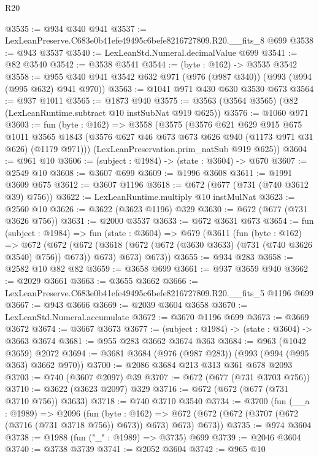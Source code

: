 \begin{lexlean}{R20}
\begin{coremodule}
@3535 := @934 @340 @941
@3537 := LexLeanPreserve.C683e0b41efe49495c6befe8216727809.R20.__fits_8 @699
@3538 := @943 @3537
@3540 := LexLeanStd.Numeral.decimalValue @699
@3541 := @82 @3540
@3542 := @3538 @3541
@3544 := (byte : @162) -> @3535 @3542
@3558 := @955 @340 @941 @3542 @632 @971 (@976 (@987 @340)) (@993 (@994 (@995 @632) @941 @970))
@3563 := @1041 @971 @430 @630 @3530 @673
@3564 := @937 @1011
@3565 := @1873 @940
@3575 := @3563 (@3564 @3565) (@82 (LexLeanRuntime.subtract @10 instSubNat @919 @625))
@3576 := @1060 @971
@3603 := fun (byte : @162) =>
  @3558
    (@3575
      (@3576
        @621
        @629
        @915
        @675
        @1011
        @3565
        @1843
        (@3576 @627 @46 @673 @673 @626 @940 (@1173 @971 @31 @626) (@1179 @971)))
      (LexLeanPreservation.prim_natSub @919 @625))
@3604 := @961 @10
@3606 := (subject : @1984) -> (state : @3604) -> @670
@3607 := @2549 @10
@3608 := @3607 @699
@3609 := @1996 @3608
@3611 := @1991 @3609 @675
@3612 := @3607 @1196
@3618 := @672 (@677 (@731 (@740 @3612 @39) @756))
@3622 := LexLeanRuntime.multiply @10 instMulNat
@3623 := @2560 @10
@3626 := @3622 (@3623 @1196) @329
@3630 := @672 (@677 (@731 @3626 @756))
@3631 := @2000 @3537
@3633 := @672 @3631 @673
@3654 := fun (subject : @1984) =>
  fun (state : @3604) =>
  @679
    (@3611
      (fun (byte : @162) =>
      @672
        (@672
          (@672 (@3618 (@672 (@672 (@3630 @3633) (@731 (@740 @3626 @3540) @756)) @673)) @673)
          @673)
        @673))
@3655 := @934 @283
@3658 := @2582 @10 @82 @82
@3659 := @3658 @699
@3661 := @937 @3659 @940
@3662 := @2029 @3661
@3663 := @3655 @3662
@3666 := LexLeanPreserve.C683e0b41efe49495c6befe8216727809.R20.__fits_5 @1196 @699
@3667 := @943 @3666
@3669 := @2039 @3604 @3658
@3670 := LexLeanStd.Numeral.accumulate
@3672 := @3670 @1196 @699
@3673 := @3669 @3672
@3674 := @3667 @3673
@3677 := (subject : @1984) -> (state : @3604) -> @3663 @3674
@3681 := @955 @283 @3662 @3674 @363
@3684 := @963 (@1042 @3659) @2072
@3694 := @3681 @3684 (@976 (@987 @283)) (@993 (@994 (@995 @363) @3662 @970))
@3700 := @2086 @3684 @213 @313 @361 @678 @2093
@3703 := @740 (@3607 @2097) @39
@3707 := @672 (@677 (@731 @3703 @756))
@3710 := @3622 (@3623 @2097) @329
@3716 := @672 (@672 (@677 (@731 @3710 @756)) @3633)
@3718 := @740 @3710 @3540
@3734 := @3700
    (fun (__a : @1989) =>
    @2096
      (fun (byte : @162) =>
      @672 (@672 (@672 (@3707 (@672 (@3716 (@731 @3718 @756)) @673)) @673) @673) @673))
@3735 := @974 @3604
@3738 := @1988 (fun ("_" : @1989) => @3735) @699
@3739 := @2046 @3604
@3740 := @3738 @3739
@3741 := @2052 @3604
@3742 := @965 @10

\end{coremodule}
\end{lexlean}
